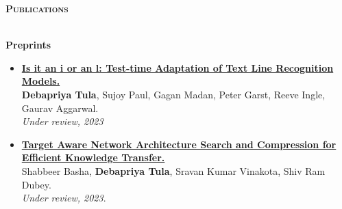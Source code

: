 \documentclass[10pt]{article}
\renewcommand{\section}[1]{
\bigskip
  \begin{Large}
  {\textsc{\textbf{#1}}}
  \end{Large}
  \hrulefill
  \medskip
  \\
}
\begin{document}
\section{Publications}
\label{sec:pubs}
\textbf{\large{Preprints}}\hfill
\begin{itemize} \itemsep-0.05em
    \item \href{https://arxiv.org/abs/2308.15037}{\textbf{Is it an i or an l: Test-time Adaptation of Text Line Recognition Models.}}\\
    \textbf{Debapriya Tula}, Sujoy Paul, Gagan Madan, Peter Garst, Reeve Ingle, Gaurav Aggarwal. \\
    \emph{Under review, 2023}
    
    \item \href{https://arxiv.org/abs/2205.05967}{\textbf{Target Aware Network Architecture Search and Compression for Efficient Knowledge Transfer.}}\\
    Shabbeer Basha, \textbf{Debapriya Tula}, Sravan Kumar Vinakota, Shiv Ram Dubey. \\
    \emph{Under review, 2023}.
\end{itemize}
\end{document}
